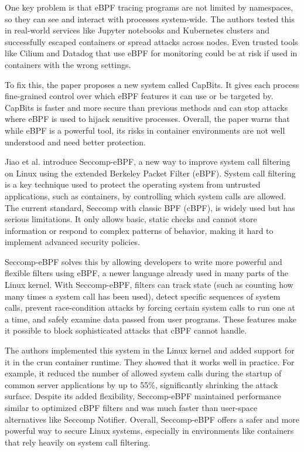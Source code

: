 \documentclass[12pt]{report}
\begin{document}
\begin{doublespace}
One key problem is that eBPF tracing programs are not limited by namespaces, so they can see and interact with processes system-wide. The authors tested this in real-world services like Jupyter notebooks and Kubernetes clusters and successfully escaped containers or spread attacks across nodes. Even trusted tools like Cilium and Datadog that use eBPF for monitoring could be at risk if used in containers with the wrong settings.

To fix this, the paper proposes a new system called CapBits. It gives each process fine-grained control over which eBPF features it can use or be targeted by. CapBits is faster and more secure than previous methods and can stop attacks where eBPF is used to hijack sensitive processes. Overall, the paper warns that while eBPF is a powerful tool, its risks in container environments are not well understood and need better protection.

Jiao et al. \cite{jia2023programmable} introduce Seccomp-eBPF, a new way to improve system call filtering on Linux using the extended Berkeley Packet Filter (eBPF). System call filtering is a key technique used to protect the operating system from untrusted applications, such as containers, by controlling which system calls are allowed. The current standard, Seccomp with classic BPF (cBPF), is widely used but has serious limitations. It only allows basic, static checks and cannot store information or respond to complex patterns of behavior, making it hard to implement advanced security policies.

Seccomp-eBPF solves this by allowing developers to write more powerful and flexible filters using eBPF, a newer language already used in many parts of the Linux kernel. With Seccomp-eBPF, filters can track state (such as counting how many times a system call has been used), detect specific sequences of system calls, prevent race-condition attacks by forcing certain system calls to run one at a time, and safely examine data passed from user programs. These features make it possible to block sophisticated attacks that cBPF cannot handle.

The authors implemented this system in the Linux kernel and added support for it in the crun container runtime. They showed that it works well in practice. For example, it reduced the number of allowed system calls during the startup of common server applications by up to 55\%, significantly shrinking the attack surface. Despite its added flexibility, Seccomp-eBPF maintained performance similar to optimized cBPF filters and was much faster than user-space alternatives like Seccomp Notifier. Overall, Seccomp-eBPF offers a safer and more powerful way to secure Linux systems, especially in environments like containers that rely heavily on system call filtering.


\end{doublespace}
\end{document}
